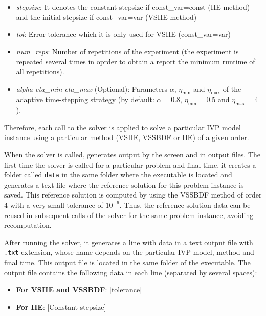 \documentclass[preprint,1p]{article}
\begin{document}
\begin{itemize}
    \item {\em stepsize}: It denotes the constant stepsize if const\_var=const (IIE method)  
	                 and the initial stepsize if const\_var=var (VSIIE method)

    \item {\em tol}: Error tolerance which it is only used for VSIIE (const\_var=var)

    \item {\em num\_reps}:  Number of repetitions of the experiment (the experiment is repeated several times in oprder 
	to obtain a report the minimum runtime of all repetitions).

    \item {\em alpha eta\_min eta\_max} (Optional):  Parameters $\alpha$, $\eta_{\min}$ and $\eta_{\max}$ of 
	the adaptive time-stepping strategy (by default: $\alpha=0.8$, $\eta_{\min}=0.5$ and $\eta_{\max}=4$).

\end{itemize}

Therefore, each call to the solver is applied to solve a particular IVP model instance using a particular method 
(VSIIE, VSSBDF or IIE) of a given order.

When the solver is called, generates output by the screen and in output files.
The first time the solver is called for a particular problem and final time, 
it creates a folder called {\tt data} in the same folder where the executable is located and
generates a text file where the reference solution for this problem instance is saved. 
This reference solution is computed by using the VSSBDF method of order 4 with a very small tolerance of 
$10^{-6}$. Thus, the reference solution
data can be reused in subsequent calls of the solver for the same problem instance, avoiding recomputation.

After running the solver, it generates a line with data in a text output file with {\tt .txt} extension, whose name
depends on the particular IVP model, method and final time. This output file is located in the same folder of the executable.
The output file contains the following data in each line (separated by several spaces):
\begin{itemize}
\item {\bf For VSIIE and VSSBDF}: [tolerance] \quad [error]   
 

\item {\bf For IIE}:  [Constant stepsize] \quad [Error]  
\quad  [Number of rejected time steps=0] 

\end{itemize}
\end{document}
